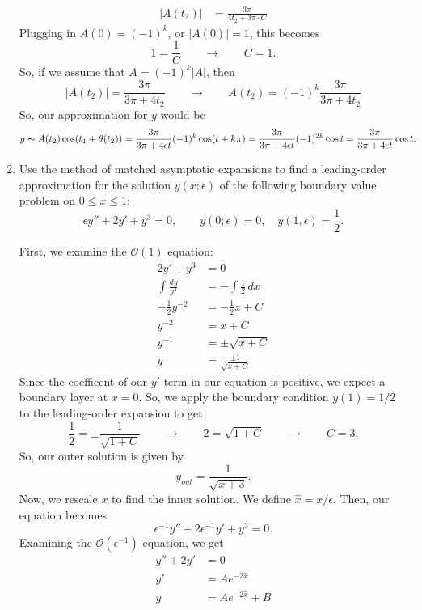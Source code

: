 \documentclass[10pt,letterpaper]{report}
\newcommand{\so}{\qquad \rightarrow \qquad}
\newcommand{\abs}[1]{\left|{#1}\right|}
\newcommand{\Ord}[1]{\mathcal{O}\left({#1}\right)}
\begin{document}
\begin{enumerate}
\begin{align*}
    \\
    \abs{A(t_2)} &= \frac{3\pi}{4t_2 + 3\pi \cdot C}
\end{align*}
Plugging in $A(0) = (-1)^k$, or $\abs{A(0)} = 1$, this becomes
\[
1 = \frac{1}{C} \so C = 1.
\]
So, if we assume that $A = (-1)^k \abs{A}$, then
\[
\abs{A(t_2)} = \frac{3\pi}{3\pi + 4t_2} \so A(t_2) = (-1)^k\frac{3\pi}{3\pi + 4t_2}
\]
So, our approximation for $y$ would be
\begin{align*}
    y &\thicksim A(t_2)\cos(t_1 + \theta(t_2))
    = \frac{3\pi }{3\pi + 4\epsilon t}(-1)^k\cos(t + k\pi)
    = \frac{3\pi }{3\pi + 4\epsilon t}(-1)^{2k}\cos t
    = \frac{3\pi}{3\pi + 4\epsilon t}\cos t.
\end{align*}

\item \begin{qbox}
Use the method of matched asymptotic expansions to find a leading-order approximation for the solution $y(x; \epsilon)$ of the following boundary value problem on $0 \leq x \leq 1:$
\[
\epsilon y'' + 2y' + y^3 = 0, \qquad y(0; \epsilon) = 0, \quad y(1, \epsilon) = \frac{1}{2}.
\]
\end{qbox}
First, we examine the $\Ord 1$ equation:
\begin{align*}
    2y' + y^3 &= 0 \\
    \int \frac{dy}{y^3} &= -\int \frac{1}{2}\,dx \\
    -\frac{1}{2}y^{-2} &= -\frac{1}{2}x + C
    \\
    y^{-2} &= x + C \\
    y^{-1} &= \pm \sqrt{x + C} \\
    y &= \frac{\pm 1}{\sqrt{x + C}}
\end{align*}
Since the coefficent of our $y'$ term in our equation is positive, we expect a boundary layer at $x = 0$. So, we apply the boundary condition $y(1) = 1/2$ to the leading-order expansion to get
\[
\frac{1}{2} = \pm \frac{1}{\sqrt{1 + C}} \so 2 = \sqrt{1 + C} \so C = 3.
\]
So, our outer solution is given by
\[
y_{out} = \frac{1}{\sqrt{x + 3}}.
\]
Now, we rescale $x$ to find the inner solution. We define $\hat x = x/\epsilon$. Then, our equation becomes 
\[
\epsilon^{-1} y'' + 2\epsilon^{-1} y' + y^3 = 0.
\]
Examining the $\Ord{\epsilon^{-1}}$ equation, we get
\begin{align*}
    y'' + 2y' &= 0 \\
    y' &= A e^{-2\hat x} \\
    y &= A e^{-2 \hat x} + B
\end{align*}

\end{enumerate}
\end{document}

